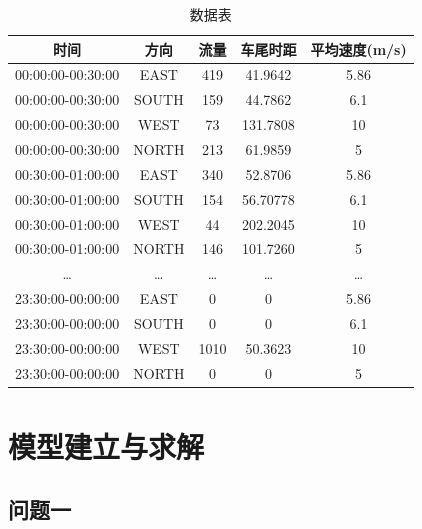 \documentclass[UTF8]{article}
\begin{document}
    \begin{table}[H]
        \centering
        \caption{数据表}
        \begin{tabular}{ccccc}
            \hline
            时间 & 方向 & 流量  & 车尾时距 & 平均速度(m/s)\\
            \hline
            00:00:00-00:30:00	&EAST	&419	&41.9642	&5.86\\
            00:00:00-00:30:00	&SOUTH	&159	&44.7862	&6.1\\
            00:00:00-00:30:00	&WEST	&73	&131.7808	&10\\
            00:00:00-00:30:00	&NORTH	&213	&61.9859	&5\\
            00:30:00-01:00:00	&EAST	&340	&52.8706	&5.86\\
            00:30:00-01:00:00	&SOUTH	&154	&56.70778	&6.1\\
            00:30:00-01:00:00	&WEST	&44	&202.2045	&10\\
            00:30:00-01:00:00	&NORTH	&146	&101.7260	&5\\
            …	&…	&…	&…	&…\\
            23:30:00-00:00:00	&EAST	&0	&0	&5.86\\
            23:30:00-00:00:00	&SOUTH	&0	&0	&6.1\\
            23:30:00-00:00:00	&WEST	&1010	&50.3623	&10\\
            23:30:00-00:00:00	&NORTH	&0	&0	&5\\
            \hline
        \end{tabular}
    \end{table}
    \section{模型建立与求解}
    \subsection{问题一}
\end{document}
